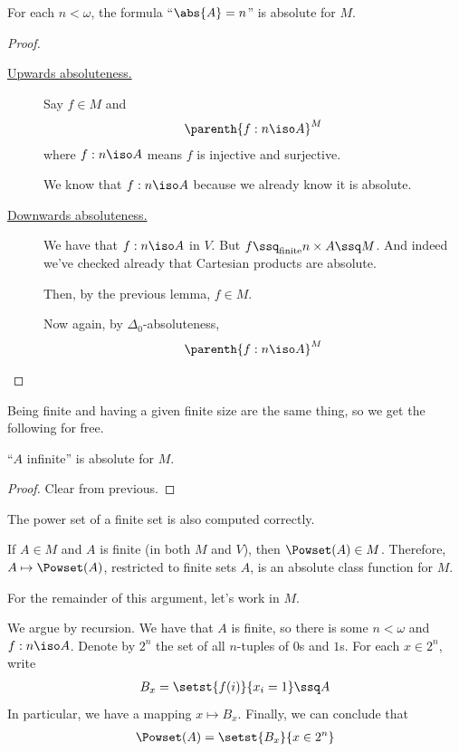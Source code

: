 \begin{boxlemma}
    For each $n < \omega$, the formula ``$\abs{A} = n$'' is absolute for $M$.
\end{boxlemma}
\begin{proof}
    \hfill 
    \begin{description}
        \item[\underline{Upwards absoluteness.}] Say $f \in M$ and
        \begin{align*}
            \parenth{f : n \iso A}^M
        \end{align*}
        where $f : n \iso A$ means $f$ is injective and surjective.

        We know that $f : n \iso A$ because we already know it is absolute.

        \item[\underline{Downwards absoluteness.}] We have that $f : n \iso A$ in $V$. But $f \ssq_{\text{finite}} n \times A \ssq M$. And indeed we've checked already that Cartesian products are absolute.

        Then, by the previous lemma, $f \in M$.

        Now again, by $\Delta_0$-absoluteness,
        \begin{align*}
            \parenth{f : n \iso A}^M
        \end{align*}
    \end{description}
\end{proof}

Being finite and having a given finite size are the same thing, so we get the following for free.

\begin{boxlemma}
    ``$A$ infinite'' is absolute for $M$.
\end{boxlemma}
\begin{proof}
    Clear from previous.
\end{proof}

The power set of a finite set is also computed correctly.

\begin{boxlemma}
    If $A \in M$ and $A$ is finite (in both $M$ and $V$), then $\Powset(A) \in M$. Therefore, $A \mapsto \Powset(A)$, restricted to finite sets $A$, is an absolute class function for $M$. %

    For the remainder of this argument, let's work in $M$.
    
    We argue by recursion. We have that $A$ is finite, so there is some $n < \omega$ and $f : n \iso A$. Denote by $2^n$ the set of all $n$-tuples of $0$s and $1$s. For each $x \in 2^n$, write
    \begin{align*}
        B_x = \setst{f(i)}{x_i = 1} \ssq A
    \end{align*}
    In particular, we have a mapping $x \mapsto B_x$. Finally, we can conclude that
    \begin{align*}
        \Powset(A) = \setst{B_x}{x \in 2^n}
    \end{align*}
\end{boxlemma}

